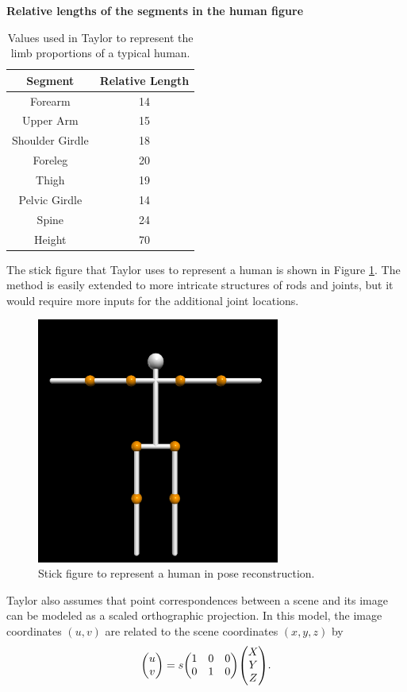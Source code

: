 \documentclass[final]{article}
\begin{document}
\begin{spacing}{1.1}
\begin{table}[h]
  \centering
  \textbf{Relative lengths of the segments in the human figure} \\
  \begin{tabular}{cc}
    \toprule[1.5pt]
    Segment & Relative Length \\
    \midrule[1pt]
    Forearm & 14 \\
    Upper Arm & 15 \\
    Shoulder Girdle & 18 \\
    Foreleg & 20 \\
    Thigh & 19 \\
    Pelvic Girdle & 14 \\
    Spine & 24 \\
    Height & 70 \\
    \bottomrule[1.5pt]
  \end{tabular}
  \caption{Values used in Taylor\cite{Taylor} to represent the limb proportions of a typical human.}
  \label{tab:bodyrel}
\end{table}

The stick figure that Taylor uses to represent a human is shown in Figure \ref{fig:stickman}. The method is easily extended to more intricate structures of rods and joints, but it would require more inputs for the additional joint locations.

\begin{figure}[h]
  \centering
  \includegraphics[width=8cm]{fig/testpose1.png}
  \caption{Stick figure to represent a human in pose reconstruction.}
  \label{fig:stickman}
\end{figure}

Taylor also assumes that point correspondences between a scene and its image can be modeled as a scaled orthographic projection. In this model, the image coordinates $(u,v)$ are related to the scene coordinates $(x,y,z)$ by
\begin{align}
  \mqty( u \\ v ) = s \mqty(1 & 0 & 0 \\ 0 & 1 & 0 )\mqty( X \\ Y \\ Z ).
  \label{eq:projection}
\end{align}


\end{spacing}
\end{document}
